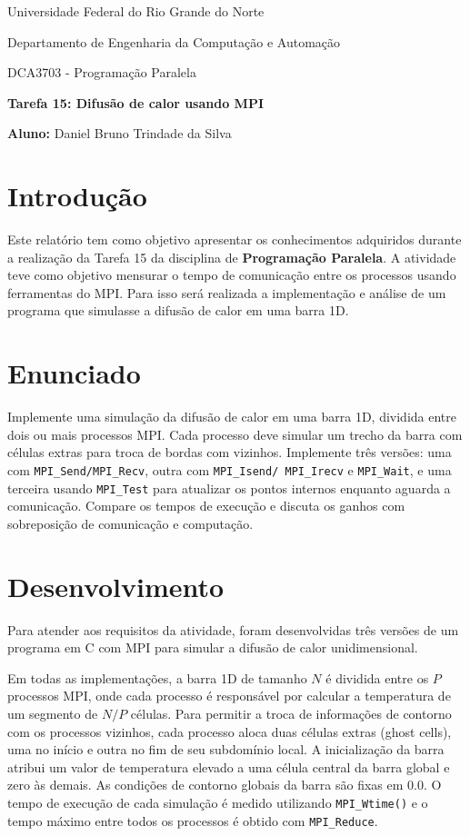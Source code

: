 \documentclass[a4paper, 12pt]{article}
\begin{document}
	
	\begin{center}
		Universidade Federal do Rio Grande do Norte
		
		Departamento de Engenharia da Computação e Automação  
		
		DCA3703 - Programação Paralela  
		
		\textbf{Tarefa 15: Difusão de calor usando MPI}  
		
		\textbf{Aluno:} Daniel Bruno Trindade da Silva  
	\end{center}  
	
	\section{Introdução}
	
	\hspace{0.62cm}Este relatório tem como objetivo apresentar os conhecimentos adquiridos durante a realização da Tarefa 15 da disciplina de \textbf{Programação Paralela}. A atividade teve como objetivo mensurar o tempo de comunicação entre os processos usando ferramentas do MPI. Para isso será realizada a implementação e análise de um programa que simulasse a difusão de calor em uma barra 1D. 
	
	\section{Enunciado}
	
	\hspace{0.62cm}Implemente uma simulação da difusão de calor em uma barra 1D, dividida entre dois ou mais processos MPI. Cada processo deve simular um trecho da barra com células extras para troca de bordas com vizinhos. Implemente três versões: uma com \texttt{MPI\_Send/MPI\_Recv}, outra com \texttt{MPI\_Isend/ MPI\_Irecv} e \texttt{MPI\_Wait}, e uma terceira usando \texttt{MPI\_Test} para atualizar os pontos internos enquanto aguarda a comunicação. Compare os tempos de execução e discuta os ganhos com sobreposição de comunicação e computação.
	
	\section{Desenvolvimento}
	\hspace{0.62cm}Para atender aos requisitos da atividade, foram desenvolvidas três versões de um programa em C com MPI para simular a difusão de calor unidimensional. 
	
	Em todas as implementações, a barra 1D de tamanho $N$ é dividida entre os $P$ processos MPI, onde cada processo é responsável por calcular a temperatura de um segmento de $N/P$ células. Para permitir a troca de informações de contorno com os processos vizinhos, cada processo aloca duas células extras (ghost cells), uma no início e outra no fim de seu subdomínio local. A inicialização da barra atribui um valor de temperatura elevado a uma célula central da barra global e zero às demais. As condições de contorno globais da barra são fixas em 0.0. O tempo de execução de cada simulação é medido utilizando \texttt{MPI\_Wtime()} e o tempo máximo entre todos os processos é obtido com \texttt{MPI\_Reduce}.
	
\end{document}
